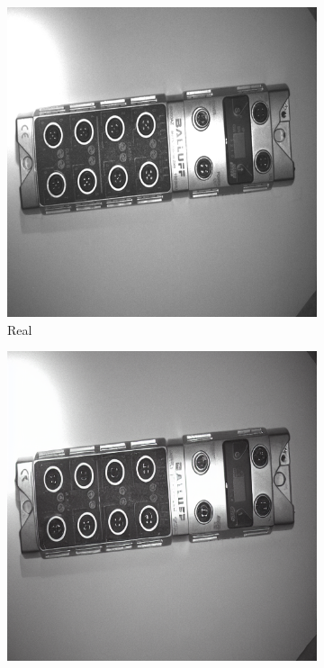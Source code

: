 \documentclass[12pt,DIV14,BCOR12mm,a4paper,footinclude=false,headinclude,parskip=half-,twoside,openright,cleardoublepage=empty,toc=index,bibliography=totoc,listof=totoc]{scrreprt}
\numberwithin{equation}{chapter}
\begin{document}
\begin{figure}
    \begin{minipage}[H]{\linewidth}
        \centering
        \begin{minipage}[H]{0.5\linewidth} %
            \centering
            \begin{subfigure}[t]{0.48\linewidth}
                \centering
                \includegraphics[width=\linewidth]{../media/bni_real_1.png}
                \caption{Real}
            \end{subfigure}%
            \hfill
            \begin{subfigure}[t]{0.48\linewidth}
                \centering
                \includegraphics[width=\linewidth]{../media/bni_generated_1_1.png}

\end{subfigure}
\end{minipage}
\end{minipage}
\end{figure}
\end{document}
